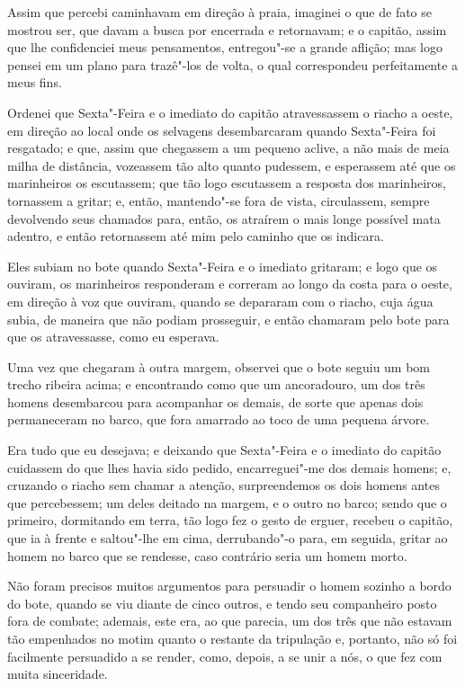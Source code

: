 Assim que percebi caminhavam em direção à praia, imaginei o que de fato
se mostrou ser, que davam a busca por encerrada e retornavam; e o
capitão, assim que lhe confidenciei meus pensamentos, entregou"-se a
grande aflição; mas logo pensei em um plano para trazê"-los de volta, o
qual correspondeu perfeitamente a meus fins.

Ordenei que Sexta"-Feira e o imediato do capitão atravessassem o riacho a
oeste, em direção ao local onde os selvagens desembarcaram quando
Sexta"-Feira foi resgatado; e que, assim que chegassem a um pequeno
aclive, a não mais de meia milha de distância, vozeassem tão alto quanto
pudessem, e esperassem até que os marinheiros os escutassem; que tão
logo escutassem a resposta dos marinheiros, tornassem a gritar; e,
então, mantendo"-se fora de vista, circulassem, sempre devolvendo seus
chamados para, então, os atraírem o mais longe possível mata adentro, e
então retornassem até mim pelo caminho que os indicara.

Eles subiam no bote quando Sexta"-Feira e o imediato gritaram; e logo que
os ouviram, os marinheiros responderam e correram ao longo da costa para
o oeste, em direção à voz que ouviram, quando se depararam com o riacho,
cuja água subia, de maneira que não podiam prosseguir, e então chamaram
pelo bote para que os atravessasse, como eu esperava.

Uma vez que chegaram à outra margem, observei que o bote seguiu um bom
trecho ribeira acima; e encontrando como que um ancoradouro, um dos três
homens desembarcou para acompanhar os demais, de sorte que apenas dois
permaneceram no barco, que fora amarrado ao toco de uma pequena árvore.

Era tudo que eu desejava; e deixando que Sexta"-Feira e o imediato do
capitão cuidassem do que lhes havia sido pedido, encarreguei"-me dos
demais homens; e, cruzando o riacho sem chamar a atenção, surpreendemos
os dois homens antes que percebessem; um deles deitado na margem, e o
outro no barco; sendo que o primeiro, dormitando em terra, tão logo fez
o gesto de erguer, recebeu o capitão, que ia à frente e saltou"-lhe em
cima, derrubando"-o para, em seguida, gritar ao homem no barco que se
rendesse, caso contrário seria um homem morto.

Não foram precisos muitos argumentos para persuadir o homem sozinho a
bordo do bote, quando se viu diante de cinco outros, e tendo seu
companheiro posto fora de combate; ademais, este era, ao que parecia, um
dos três que não estavam tão empenhados no motim quanto o restante da
tripulação e, portanto, não só foi facilmente persuadido a se render,
como, depois, a se unir a nós, o que fez com muita sinceridade.

